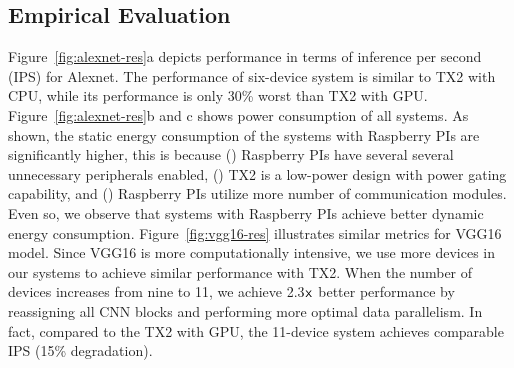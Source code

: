 \documentclass[sigplan]{acmart}
\newcommand*{\x}{\mathsf{x}\mskip1mu}
\begin{document}
\subsection{Empirical Evaluation}
%
%
Figure~\ref{fig:alexnet-res}a depicts performance in terms of inference per second (IPS) for Alexnet. The performance of six-device system is similar to TX2 with CPU, while its performance is only 30\% worst than TX2 with GPU. Figure~\ref{fig:alexnet-res}b and c shows power consumption of all systems. As shown, the static energy consumption of the systems with Raspberry PIs are significantly higher, this is because () Raspberry PIs have several several unnecessary peripherals enabled, () TX2 is a low-power design with power gating capability, and () Raspberry PIs utilize more number of communication modules. Even so, we observe that systems with Raspberry PIs achieve better dynamic energy consumption. Figure~\ref{fig:vgg16-res} illustrates similar metrics for VGG16 model. Since VGG16 is more computationally intensive, we use more devices in our systems to achieve similar performance with TX2. When the number of devices increases from nine to 11, we achieve 2.3$\x$ better performance by reassigning all CNN blocks and performing more optimal data parallelism. In fact, compared to the TX2 with GPU, the 11-device system achieves comparable IPS (15\% degradation).
\end{document}
